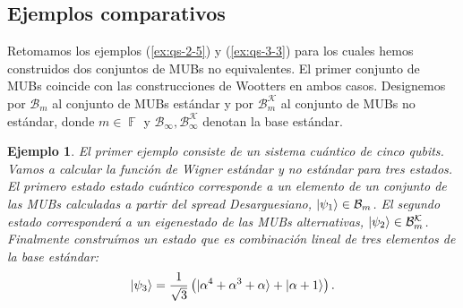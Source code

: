 \documentclass[a4paper]{report}
\DeclareMathOperator{\F}{\mathbb{F}}
\newtheorem{example}{Ejemplo}
\begin{document}
  \subsection{Ejemplos comparativos} 

  Retomamos los ejemplos (\ref{ex:qs-2-5}) y
  (\ref{ex:qs-3-3}) para los cuales hemos construidos dos
  conjuntos de MUBs no equivalentes. El primer conjunto de
  MUBs coincide con las construcciones de Wootters en ambos
  casos. Designemos por $\mathcal B_m$ al conjunto de MUBs
  estándar y por $\mathcal B_m^{\mathcal K}$ al conjunto de
  MUBs no estándar, donde $m \in \F$ y $\mathcal B_\infty,
  \mathcal B_\infty^{\mathcal K}$ denotan la base estándar.

  \begin{example}
    El primer ejemplo consiste de un sistema cuántico de
    cinco qubits. Vamos a calcular la función de Wigner
    estándar y no estándar para tres estados. El primero
    estado estado cuántico corresponde a un elemento de un
    conjunto de las MUBs calculadas a partir del spread
    Desarguesiano, $\ket{\psi_1} \in \mathcal B_m$. El
    segundo estado corresponderá a un eigenestado de las
    MUBs alternativas, $\ket{\psi_2} \in \mathcal
    B_m^{\mathcal K}$. Finalmente construímos un estado que
    es combinación lineal de tres elementos de la base
    estándar:
    \[
      \ket{\psi_3}
      = \frac{1}{\sqrt{3}} \left(
        \ket{\alpha^{4} + \alpha^3 + \alpha}
        + 
        \ket{\alpha+1}
      \right).
    \] 
  \end{example}
\end{document}
